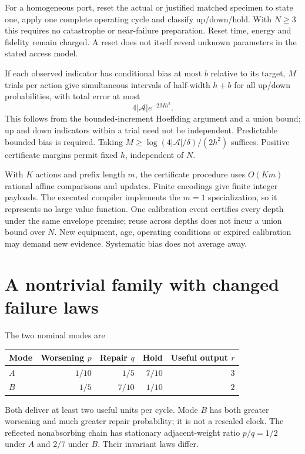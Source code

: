 \documentclass[10pt,a4paper]{article}
\begin{document}
For a homogeneous port, reset the actual or justified matched specimen to state one, apply one complete operating cycle and classify up/down/hold. With $N\ge3$ this requires no catastrophe or near-failure preparation. Reset time, energy and fidelity remain charged. A reset does not itself reveal unknown parameters in the stated access model.

If each observed indicator has conditional bias at most $b$ relative to its target, $M$ trials per action give simultaneous intervals of half-width $h+b$ for all up/down probabilities, with total error at most
\begin{equation}
4|\mathcal A|e^{-2Mh^2}.
\label{eq:hoeffding}
\end{equation}
This follows from the bounded-increment Hoeffding argument and a union bound; up and down indicators within a trial need not be independent. Predictable bounded bias is required. Taking
$M\ge\log(4|\mathcal A|/\delta)/(2h^2)$ suffices. Positive certificate margins permit fixed $h$, independent of $N$.

With $K$ actions and prefix length $m$, the certificate procedure uses $O(Km)$ rational affine comparisons and updates. Finite encodings give finite integer payloads. The executed compiler implements the $m=1$ specialization, so it represents no large value function. One calibration event certifies every depth under the same envelope premise; reuse across depths does not incur a union bound over $N$. New equipment, age, operating conditions or expired calibration may demand new evidence. Systematic bias does not average away.

\section{A nontrivial family with changed failure laws}

The two nominal modes are
\begin{center}
\begin{tabular}{lrrrr}\toprule
Mode & Worsening $p$ & Repair $q$ & Hold & Useful output $r$\\\midrule
$A$ & $1/10$ & $1/5$ & $7/10$ & $3$\\
$B$ & $1/5$ & $7/10$ & $1/10$ & $2$\\\bottomrule
\end{tabular}
\end{center}
Both deliver at least two useful units per cycle. Mode $B$ has both greater worsening and much greater repair probability; it is not a rescaled clock. The reflected nonabsorbing chain has stationary adjacent-weight ratio $p/q=1/2$ under $A$ and $2/7$ under $B$. Their invariant laws differ.
\end{document}
